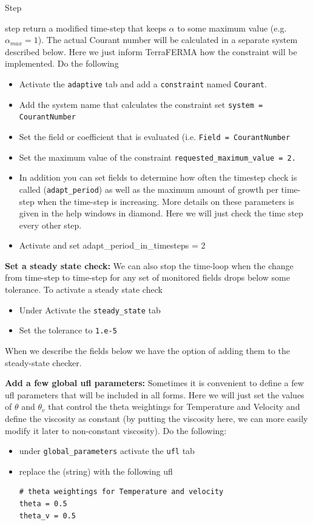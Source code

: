 \begin{steps}{Step}
\begin{steps}{step}
    return a modified time-step that keeps $\alpha$ to some maximum
    value (e.g. $\alpha_{max}=1$).  The actual Courant number will be calculated in a
    separate system described below.    Here we just inform TerraFERMA how the
    constraint will be implemented.  Do the following
    \begin{itemize}
    \item Activate the
    \texttt{adaptive} tab and add a \texttt{constraint} named
    \texttt{Courant}.
  \item Add the system name that calculates the constraint set
    \texttt{system = CourantNumber}
  \item Set the field or coefficient that is evaluated
    (i.e. \texttt{Field = CourantNumber}
  \item Set the maximum value of the constraint
    \texttt{requested\_maximum\_value = 2.}
  \item In addition you can set fields to determine how often the
    timestep check is called (\texttt{adapt\_period}) as well as the
    maximum amount of growth per time-step when the time-step is
    increasing.  More details on these parameters is given in the help
    windows in diamond. Here we will just check the time step every
    other step.
  \item Activate and set {adapt\_period\_in\_timesteps = 2}
    \end{itemize}
  \item \textbf{Set a steady state check:} We can also stop the
    time-loop when the change from time-step to time-step for any set
    of monitored fields drops below some tolerance.  To activate a
    steady state check
    \begin{itemize}
    \item Under \texttt{}Activate the \texttt{steady\_state} tab
    \item Set the tolerance to \texttt{1.e-5}
    \end{itemize}
    When we describe the fields below we have the option of adding
    them to the steady-state checker.
  \end{steps}
\item \textbf{Add a few global ufl parameters:}  Sometimes it is
  convenient to define a few ufl parameters that will be included in
  all forms.  Here we will just set the values of $\theta$ and
  $\theta_{v}$ that control the theta weightings for Temperature and
  Velocity and define the viscosity as constant (by putting the
  viscosity here, we can more easily modify it later to non-constant viscosity).  Do the following:
  \begin{itemize}
  \item under \texttt{global\_parameters} activate the \texttt{ufl} tab
  \item replace the (string) with the following ufl
    \begin{lstlisting}[style=UFL]
# theta weightings for Temperature and velocity
theta = 0.5
theta_v = 0.5


\end{lstlisting}
\end{itemize}
\end{steps}
